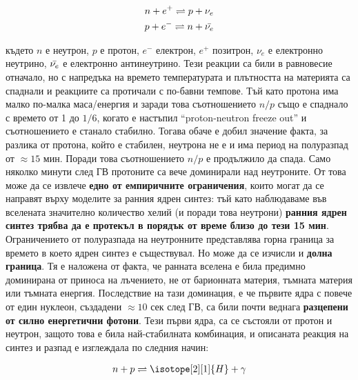 \documentclass[a4paper,12pt]{article}
\begin{document}
\begin{gather}
  n + e^+  \rightleftharpoons p + \nu_e\\
  p + e^- \rightleftharpoons n + \Bar{\nu_e}
\end{gather}

където $n$ е неутрон, $p$ е протон, $e^-$ електрон, $e^+$ позитрон, $\nu_e$ е електронно неутрино, $\Bar{\nu_e}$ е електронно антинеутрино. Тези реакции са били в равновесие отначало, но с напредъка на времето температурата и плътността на материята са спаднали и реакциите са протичали с по-бавни темпове. Тъй като протона има малко по-малка маса/енергия и заради това съотношението $n/p$ също е спаднало с времето от 1 до $1/6$, когато е настъпил ``proton-neutron freeze out'' и съотношението е станало стабилно. Тогава обаче е добил значение факта, за разлика от протона, който е стабилен, неутрона не е и има период на полуразпад от $\approx 15$ мин. Поради това съотношението $n/p$ е продължило да спада. Само няколко минути след ГВ протоните са вече доминирали над неутроните. От това може да се извлече \textbf{едно от емпиричните ограничения}, които могат да се направят върху моделите за ранния ядрен синтез: тъй като наблюдаваме във вселената значително количество хелий (и поради това неутрони) \textbf{ранния ядрен синтез трябва да е протекъл в порядък от време близо до тези 15 мин}.\\

Ограничението от полуразпада на неутронните представлява горна граница за времето в което ядрен синтез е съществувал. Но може да се изчисли и \textbf{долна граница}. Тя е наложена от факта, че ранната вселена е била предимно доминирана от приноса на лъчението, не от барионната материя, тъмната материя или тъмната енергия. Последствие на тази доминация, е че първите ядра с повече от един нуклеон, създадени $\approx 10$ сек след ГВ, са били почти веднага \textbf{разцепени от силно енергетични фотони}. Тези първи ядра, са се състояли от протон и неутрон, защото това е била най-стабилната комбинация, и описаната реакция на синтез и разпад е изглеждала по следния начин:

\begin{gather}
  n + p  \rightleftharpoons \isotope[2][1]{H} + \gamma
\label{eq:deuterium}
\end{gather}
\end{document}
